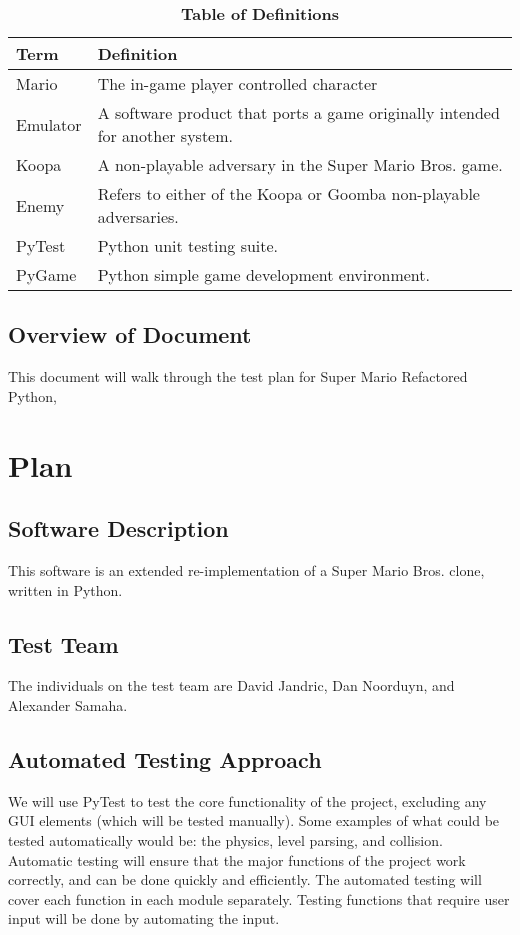 \documentclass[12pt, titlepage]{article}
\begin{document}
\begin{table}[!htbp]
\caption{\textbf{Table of Definitions}} \label{Table}
\begin{tabularx}{\textwidth}{p{3cm}X}
\toprule
\textbf{Term} & \textbf{Definition}\\
\midrule
Mario & The in-game player controlled character\\
Emulator & A software product that ports a game originally intended for another system.\\
Koopa & A non-playable adversary in the Super Mario Bros. game.\\
Enemy & Refers to either of the Koopa or Goomba non-playable adversaries.\\
PyTest & Python unit testing suite.\\
PyGame & Python simple game development environment.\\
\bottomrule
\end{tabularx}
\end{table}	



\subsection{Overview of Document}
This document will walk through the test plan for Super Mario Refactored Python, 



\section{Plan}

\subsection{Software Description}
This software is an extended re-implementation of a Super Mario Bros. clone,
written in Python.


\subsection{Test Team}
The individuals on the test team are David Jandric, Dan Noorduyn, and Alexander Samaha.



\subsection{Automated Testing Approach}
We will use PyTest to test the core functionality of the project, excluding any 
GUI elements (which will be tested manually). Some examples of what could be
tested automatically would be: the physics, level parsing, and collision. 
Automatic testing will ensure that the major functions of the project work
correctly, and can be done quickly and efficiently. The automated testing
will cover each function in each module separately. Testing functions that require
user input will be done by automating the input.
\end{document}
